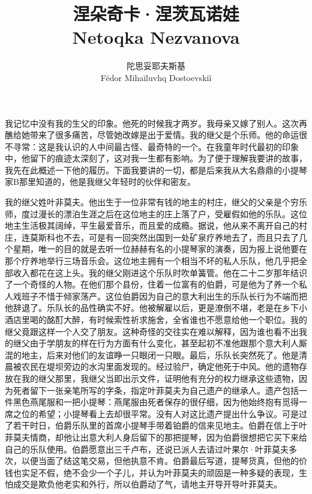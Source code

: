\documentclass[12pt, UTF8]{ctexbook}
\newcommand\subtitle[1]{{\normalsize #1}} %
\begin{document}
\title{涅朵奇卡·涅茨瓦诺娃 \\ \subtitle{\selectfont Netoqka Nezvanova}}
\author{陀思妥耶夫斯基 \\ \small{}\selectfont F\"edor Miha\u{i}luvhq Dostoevski\u{i}}
\maketitle


\newpage
\par 我记忆中没有我的生父的印象。他死的时候我才两岁。我母亲又嫁了别人。这次再醮给她带来了很多痛苦，尽管她改嫁是出于爱情。我的继父是个乐师。他的命运很不寻常：这是我认识的人中间最古怪、最奇特的一个。在我童年时代最初的印象中，他留下的痕迹太深刻了，这对我一生都有影响。为了便于理解我要讲的故事，我先在此概述一下他的履历。下面我要讲的一切，都是后来我从大名鼎鼎的小提琴家B那里知道的，他是我继父年轻时的伙伴和密友。
\par 我的继父姓叶非莫夫。他出生于一位非常有钱的地主的村庄，继父的父亲是个穷乐师，度过漫长的漂泊生涯之后在这位地主的庄上落了户，受雇假如他的乐队。这位地主生活极其阔绰，平生最爱音乐，而且爱的成瘾。据说，他从来不离开自己的村庄，连莫斯科也不去，可是有一回突然出国到一处矿泉疗养地去了，而且只去了几个星期，唯一的目的就是去听一位赫赫有名的小提琴家的演奏，因为报上说他要在那个疗养地举行三场音乐会。这位地主拥有一个相当不坏的私人乐队，他几乎把全部收入都花在这上头。我的继父刚进这个乐队时吹单簧管。他在二十二岁那年结识了一个奇怪的人物。在他们那个县份，住着一位富有的伯爵，可是他为了养一个私人戏班子不惜于倾家荡产。这位伯爵因为自己的意大利出生的乐队长行为不端而把他辞退了。乐队长的品性确实不好。他被解雇以后，更是潦倒不堪，老是在乡下小酒店里喝的酩酊大醉，有时候索性祈求施舍，全省谁也不愿意给他一个职位。我的继父竟跟这样一个人交了朋友。这种奇怪的交往实在难以解释，因为谁也看不出我的继父由于学朋友的样在行为方面有什么变化，甚至起初不准他跟那个意大利人厮混的地主，后来对他们的友谊睁一只眼闭一只眼。最后，乐队长突然死了。他是清晨被农民在堤坝旁边的水沟里面发现的。经过验尸，确定他死于中风。他的遗物存放在我的继父那里，我继父当即出示文件，证明他有充分的权力继承这些遗物，因为死者留下一张亲笔所写的字条，指定叶菲莫夫为自己遗产的继承人。遗产包括一件黑色燕尾服和一把小提琴：燕尾服由死者保存的很仔细，因为他始终抱有觅得一席之位的希望；小提琴看上去却很平常。没有人对这比遗产提出什么争议。可是过了若干时日，伯爵乐队里的首席小提琴手带着铂爵的信来见地主。伯爵在信上于叶菲莫夫情商，却他让出意大利人身后留下的那把提琴，因为伯爵很想把它买下来给自己的乐队使用。伯爵愿意出三千卢布，还说已派人去请过叶果尔·叶菲莫夫多次，以便当面了结这笔交易，但他执意不肯。伯爵最后写道，提琴货真，但他的价钱也实足不假，绝不会少一个子儿，并认为叶菲莫夫的顽固是一种多疑的表现，生怕成交是欺负他老实和外行，所以伯爵动了气，请地主开导开导叶菲莫夫。
\end{document}
